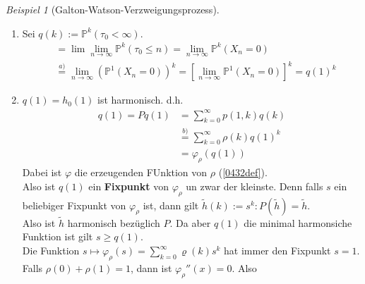 \documentclass[10pt,a4paper]{article}
\newcommand{\Prb}{\mathbb P}
\theoremstyle{plain}
\theoremstyle{definition}
\theoremstyle{remark}
\newtheorem{exm}[theorem]{Beispiel}
\begin{document}
\begin{exm}[Galton-Watson-Verzweigungsprozess]
\begin{enumerate}
			\item Sei $q(k):=\Prb^k(\tau_0<\infty)$.\\
			\begin{align*}
			&=\lim\lim\limits_{n\to\infty}\Prb^k(\tau_0\leq n)=\lim\limits_{n\to\infty}\Prb^k(X_n=0)\\
			&\overset{a)}{=}\lim\limits_{n\to\infty}\left(\Prb^1(X_n=0)\right)^k=\left[\lim\limits_{n\to\infty}\Prb^1(X_n=0)\right]^k=q(1)^k
			\end{align*}
			\item $q(1)=h_0(1)$ ist harmonisch. d.h.
			\begin{align*}
			q(1)=Pq(1)&=\sum_{k=0}^{\infty}p(1,k)q(k)\\
			&\overset{b)}{=}\sum_{k=0}^\infty\rho(k)q(1)^k\\
			&=\varphi_\rho(q(1))
			\end{align*}
			Dabei ist $\varphi$ die erzeugenden FUnktion von $\rho$ (\ref{0432def}).\\
			Also ist $q(1)$ ein \textbf{Fixpunkt} von $\varphi_\rho$ un zwar der kleinste. Denn falls $s$ ein beliebiger Fixpunkt von $\varphi_\rho$ ist, dann gilt $\tilde h(k):=s^k:P(\tilde h)=\tilde h$.\\
			Also ist $\tilde h$ harmonisch bezüglich $P$. Da aber $q(1)$ die minimal harmonsiche Funktion ist gilt $s\geq q(1)$.\\
			Die Funktion $s\mapsto \varphi_\rho(s)=\sum_{k=0}^{\infty}\varrho(k)s^k$ hat immer den Fixpunkt $s=1$.\\
			Falls $\rho(0)+\rho(1)=1$, dann ist $\varphi_\rho''(x)=0$. Also 
		\end{enumerate}
	\end{exm}
\end{document}
